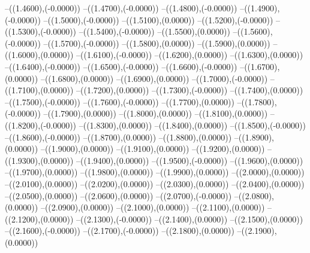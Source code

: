 {	--({\sx*(1.4600)},{\sy*(-0.0000)})
	--({\sx*(1.4700)},{\sy*(-0.0000)})
	--({\sx*(1.4800)},{\sy*(-0.0000)})
	--({\sx*(1.4900)},{\sy*(-0.0000)})
	--({\sx*(1.5000)},{\sy*(-0.0000)})
	--({\sx*(1.5100)},{\sy*(0.0000)})
	--({\sx*(1.5200)},{\sy*(-0.0000)})
	--({\sx*(1.5300)},{\sy*(-0.0000)})
	--({\sx*(1.5400)},{\sy*(-0.0000)})
	--({\sx*(1.5500)},{\sy*(0.0000)})
	--({\sx*(1.5600)},{\sy*(-0.0000)})
	--({\sx*(1.5700)},{\sy*(-0.0000)})
	--({\sx*(1.5800)},{\sy*(0.0000)})
	--({\sx*(1.5900)},{\sy*(0.0000)})
	--({\sx*(1.6000)},{\sy*(0.0000)})
	--({\sx*(1.6100)},{\sy*(-0.0000)})
	--({\sx*(1.6200)},{\sy*(0.0000)})
	--({\sx*(1.6300)},{\sy*(0.0000)})
	--({\sx*(1.6400)},{\sy*(-0.0000)})
	--({\sx*(1.6500)},{\sy*(-0.0000)})
	--({\sx*(1.6600)},{\sy*(-0.0000)})
	--({\sx*(1.6700)},{\sy*(0.0000)})
	--({\sx*(1.6800)},{\sy*(0.0000)})
	--({\sx*(1.6900)},{\sy*(0.0000)})
	--({\sx*(1.7000)},{\sy*(-0.0000)})
	--({\sx*(1.7100)},{\sy*(0.0000)})
	--({\sx*(1.7200)},{\sy*(0.0000)})
	--({\sx*(1.7300)},{\sy*(-0.0000)})
	--({\sx*(1.7400)},{\sy*(0.0000)})
	--({\sx*(1.7500)},{\sy*(-0.0000)})
	--({\sx*(1.7600)},{\sy*(-0.0000)})
	--({\sx*(1.7700)},{\sy*(0.0000)})
	--({\sx*(1.7800)},{\sy*(-0.0000)})
	--({\sx*(1.7900)},{\sy*(0.0000)})
	--({\sx*(1.8000)},{\sy*(0.0000)})
	--({\sx*(1.8100)},{\sy*(0.0000)})
	--({\sx*(1.8200)},{\sy*(-0.0000)})
	--({\sx*(1.8300)},{\sy*(0.0000)})
	--({\sx*(1.8400)},{\sy*(0.0000)})
	--({\sx*(1.8500)},{\sy*(-0.0000)})
	--({\sx*(1.8600)},{\sy*(-0.0000)})
	--({\sx*(1.8700)},{\sy*(0.0000)})
	--({\sx*(1.8800)},{\sy*(0.0000)})
	--({\sx*(1.8900)},{\sy*(0.0000)})
	--({\sx*(1.9000)},{\sy*(0.0000)})
	--({\sx*(1.9100)},{\sy*(0.0000)})
	--({\sx*(1.9200)},{\sy*(0.0000)})
	--({\sx*(1.9300)},{\sy*(0.0000)})
	--({\sx*(1.9400)},{\sy*(0.0000)})
	--({\sx*(1.9500)},{\sy*(-0.0000)})
	--({\sx*(1.9600)},{\sy*(0.0000)})
	--({\sx*(1.9700)},{\sy*(0.0000)})
	--({\sx*(1.9800)},{\sy*(0.0000)})
	--({\sx*(1.9900)},{\sy*(0.0000)})
	--({\sx*(2.0000)},{\sy*(0.0000)})
	--({\sx*(2.0100)},{\sy*(0.0000)})
	--({\sx*(2.0200)},{\sy*(0.0000)})
	--({\sx*(2.0300)},{\sy*(0.0000)})
	--({\sx*(2.0400)},{\sy*(0.0000)})
	--({\sx*(2.0500)},{\sy*(0.0000)})
	--({\sx*(2.0600)},{\sy*(0.0000)})
	--({\sx*(2.0700)},{\sy*(-0.0000)})
	--({\sx*(2.0800)},{\sy*(0.0000)})
	--({\sx*(2.0900)},{\sy*(0.0000)})
	--({\sx*(2.1000)},{\sy*(0.0000)})
	--({\sx*(2.1100)},{\sy*(0.0000)})
	--({\sx*(2.1200)},{\sy*(0.0000)})
	--({\sx*(2.1300)},{\sy*(-0.0000)})
	--({\sx*(2.1400)},{\sy*(0.0000)})
	--({\sx*(2.1500)},{\sy*(0.0000)})
	--({\sx*(2.1600)},{\sy*(-0.0000)})
	--({\sx*(2.1700)},{\sy*(-0.0000)})
	--({\sx*(2.1800)},{\sy*(0.0000)})
	--({\sx*(2.1900)},{\sy*(0.0000)})
}
